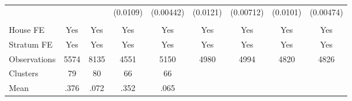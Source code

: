 {\begin{tabular}{l*{8}{c}}
                &         &         & (0.0109)&(0.00442)& (0.0121)&(0.00712)& (0.0101)&(0.00474)\\
                &         &         &         &         &         &         &         &         \\
House FE        &      Yes&      Yes&      Yes&      Yes&      Yes&      Yes&      Yes&      Yes\\
Stratum FE      &      Yes&      Yes&      Yes&      Yes&      Yes&      Yes&      Yes&      Yes\\
\midrule
Observations    &     5574&     8135&     4551&     5150&     4980&     4994&     4820&     4826\\
Clusters        &       79&       80&       66&       66&         &         &         &         \\
Mean            &     .376&     .072&     .352&     .065&         &         &         &         \\
\bottomrule
\end{tabular}
}
